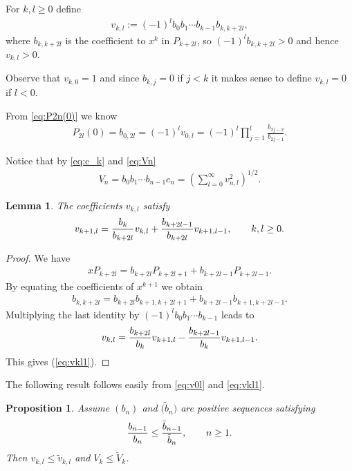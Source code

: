 \documentclass[pdftex]{sigma}
\numberwithin{equation}{section}
\newtheorem{prop}[thm]{Proposition}
\newtheorem{lem}[thm]{Lemma}
\begin{document}
For $k,l\ge 0$ define
\begin{gather}\label{eq:vkl}
v_{k,l}:= (-1)^l b_0b_1\cdots b_{k-1} b_{k,k+2l},
\end{gather}
where $b_{k,k+2l}$ is the coefficient to $x^k$ in $P_{k+2l}$, so $(-1)^lb_{k,k+2l}>0$ and hence $v_{k,l}>0$.

Observe that $v_{k,0}=1$ and since $b_{k,j}=0$ if $j<k$ it makes sense to define $v_{k,l}=0$ if $l<0$.

From \eqref{eq:P2n(0)} we know
\begin{gather}\label{eq:v0l}
P_{2l}(0)=b_{0,2l}=(-1)^lv_{0,l}=(-1)^l\prod_{j=1}^l \frac{b_{2j-2}}{b_{2j-1}}.
\end{gather}

Notice that by \eqref{eq:c_k} and \eqref{eq:Vn}
\begin{gather}\label{eq:V_n1}
V_n=b_0b_1\cdots b_{n-1} c_n=\left(\sum_{l=0}^\infty v_{n,l}^2\right)^{1/2}.
\end{gather}

\begin{lem}\label{thm:vkl}
The coefficients $v_{k,l}$ satisfy
\begin{gather}\label{eq:vkl1} v_{k+1,l}={b_k\over b_{k+2l}}v_{k,l}+ {b_{k+2l-1}\over b_{k+2l}}v_{k+1,l-1},\qquad k,l\ge 0.
\end{gather}
\end{lem}

\begin{proof}We have
\begin{gather*}
x P_{k+2l}=b_{k+2l}P_{k+2l+1}+b_{k+2l-1}P_{k+2l-1}.
\end{gather*}
By equating the coefficients of $x^{k+1}$ we obtain
\begin{gather*}
b_{k,k+2l}=b_{k+2l}b_{k+1,k+2l+1}+ b_{k+2l-1}b_{k+1,k+2l-1}.
\end{gather*}
Multiplying the last identity by $(-1)^lb_0b_1\cdots b_{k-1}$ leads to
\begin{gather*}
 v_{k,l}={b_{k+2l}\over b_k}v_{k+1,l}- { b_{k+2l-1}\over b_k}v_{k+1,l-1}.
\end{gather*}
 This gives (\ref{eq:vkl1}).
\end{proof}

The following result follows easily from \eqref{eq:v0l} and \eqref{eq:vkl1}.

\begin{prop}\label{thm:compV} Assume $(b_n)$ and $\big(\tilde{b}_n\big)$ are positive sequences satisfying
\begin{gather*}
{b_{n-1}\over b_{n}} \le {\tilde{b}_{n-1}\over \tilde{b}_{n}} ,\qquad n\ge 1.
\end{gather*}
 Then $v_{k,l} \le \tilde{v}_{k,l} $ and $V_k \le \tilde{V}_k$.
\end{prop}
\end{document}
